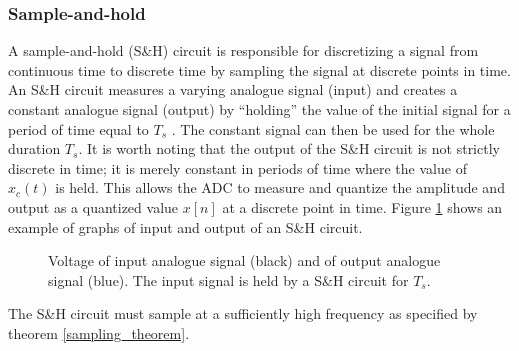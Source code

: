 \subsubsection{Sample-and-hold}
 A sample-and-hold (S\&H) circuit is responsible for discretizing a signal from continuous time to discrete time by sampling the signal at discrete points in time. An S\&H circuit measures a varying analogue signal (input) and creates a constant analogue signal (output) by ``holding'' the value of the initial signal for a period of time equal to $T_s$ \cite{pelgrom}. The constant signal can then be used for the whole duration $T_s$. It is worth noting that the output of the S\&H circuit is not strictly discrete in time; it is merely constant in periods of time where the value of $x_c(t)$ is held. This allows the ADC to measure and quantize the amplitude and output as a quantized value $x[n]$ at a discrete point in time. Figure \ref{fig:S/H} shows an example of graphs of input and output of an S\&H circuit.
\begin{figure}[H]
\centering
{}
\caption{Voltage of input analogue signal (black) and of output analogue signal (blue). The input signal is held by a S\&H circuit for $T_s$.}
\label{fig:S/H}
\end{figure}
The S\&H circuit must sample at a sufficiently high frequency as specified by theorem \ref{sampling_theorem}.

